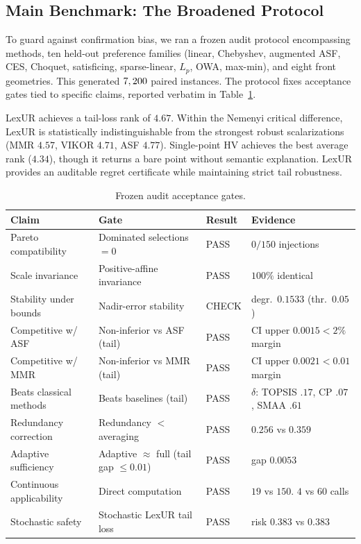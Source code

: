 \subsection{Main Benchmark: The Broadened Protocol}
\label{sec:protocol}
To guard against confirmation bias, we ran a frozen audit protocol encompassing \protocolMethods{} methods, ten held-out preference families (linear, Chebyshev, augmented ASF, CES, Choquet, satisficing, sparse-linear, $L_p$, OWA, max-min), and eight front geometries. This generated $7,200{}$ paired instances. The protocol fixes acceptance gates tied to specific claims, reported verbatim in Table~\ref{tab:gates}. 

LexUR achieves a tail-loss rank of $4.67$. Within the Nemenyi critical difference, LexUR is statistically indistinguishable from the strongest robust scalarizations (MMR $4.57$, VIKOR $4.71$, ASF $4.77$). Single-point HV achieves the best average rank ($4.34$), though it returns a bare point without semantic explanation. LexUR provides an auditable regret certificate while maintaining strict tail robustness.

\begin{table}[t]
\centering\small
\caption{Frozen audit acceptance gates.}
\label{tab:gates}
\begin{tabular}{llll}
\toprule
Claim & Gate & Result & Evidence\\
\midrule
Pareto compatibility & Dominated selections $=0$ & PASS & $0/150$ injections\\
Scale invariance & Positive-affine invariance & PASS & $100\%$ identical\\
Stability under bounds & Nadir-error stability & CHECK & degr.\ $0.1533$ (thr.\ $0.05$)\\
Competitive w/ ASF & Non-inferior vs ASF (tail) & PASS & CI upper $0.0015 < 2\%$ margin\\
Competitive w/ MMR & Non-inferior vs MMR (tail) & PASS & CI upper $0.0021 < 0.01$ margin\\
Beats classical methods & Beats baselines (tail) & PASS & $\delta$: TOPSIS $.17$, CP $.07$, SMAA $.61$\\
Redundancy correction & Redundancy $<$ averaging & PASS & $0.256$ vs $0.359$\\
Adaptive sufficiency & Adaptive $\approx$ full (tail gap $\le0.01$) & PASS & gap $0.0053$\\
Continuous applicability & Direct computation & PASS & $19$ vs $150$. $4$ vs $60$ calls\\
Stochastic safety & Stochastic LexUR tail loss & PASS & risk $0.383$ vs $0.383$\\
\bottomrule
\end{tabular}
\end{table}

